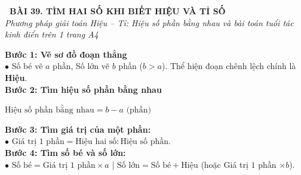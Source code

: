 \documentclass[14pt,a4paper,oneside]{extbook}
\begin{document}
\noindent
\begin{tcolorbox}[
  enhanced,
  colback=teal!8!white,
  colframe=teal!80!black,
  arc=3mm,
  boxrule=1.1pt,
  width=\linewidth,
  halign=center,
  top=2.2mm, bottom=2.2mm,
  left=3mm, right=3mm,
  drop fuzzy shadow
]
  {\large\bfseries\color{teal!95!black}\faBookmark\ BÀI 39. TÌM HAI SỐ KHI BIẾT HIỆU VÀ TỈ SỐ}\\[2pt]
  {\scriptsize\color{black!75}\itshape Phương pháp giải toán Hiệu -- Tỉ: Hiệu số phần bằng nhau và bài toán tuổi tác kinh điển trên 1 trang A4}
\end{tcolorbox}

\vspace{3.2mm}
\noindent
\begin{tcolorbox}[
  enhanced,
  title={\footnotesize\bfseries\color{white}\faKey\ 1. Bốn bước vàng giải bài toán Hiệu -- Tỉ},
  colback=blue!2!white,
  colframe=blue!75!black,
  arc=2.5mm, boxrule=0.8pt, top=1.8mm, bottom=1.8mm, left=2.5mm, right=2.5mm
]
  \footnotesize
  \textbf{Bước 1: Vẽ sơ đồ đoạn thẳng}\\
  $\bullet$ Số bé vẽ $a$ phần, Số lớn vẽ $b$ phần ($b > a$). Thể hiện đoạn chênh lệch chính là \textbf{Hiệu}.\\
  \textbf{Bước 2: Tìm hiệu số phần bằng nhau}\\
  \begin{tcolorbox}[colback=white, colframe=blue!75!black, boxrule=0.5pt, arc=1.5mm, halign=center, top=1mm, bottom=1mm]
    {\scriptsize\bfseries\color{blue!90!black}$\text{Hiệu số phần bằng nhau} = b - a\text{ (phần)}$}
  \end{tcolorbox}
  \textbf{Bước 3: Tìm giá trị của một phần:}\\
  $\bullet$ $\text{Giá trị } 1\text{ phần} = \text{Hiệu hai số} : \text{Hiệu số phần}$.\\
  \textbf{Bước 4: Tìm số bé và số lớn:}\\
  $\bullet$ $\text{Số bé} = \text{Giá trị } 1\text{ phần} \times a$ \quad | \quad $\text{Số lớn} = \text{Số bé} + \text{Hiệu}$ (hoặc Giá trị $1$ phần $\times b$).
\end{tcolorbox}

\vspace{3mm}
\end{document}
